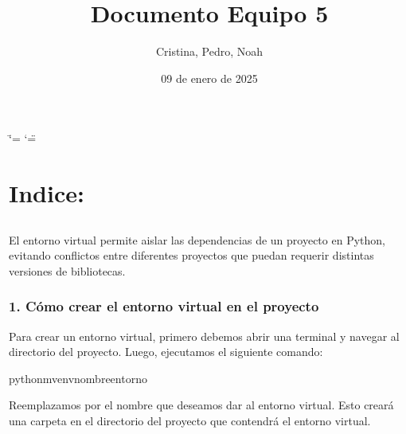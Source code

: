 \documentclass[a4paper,10pt,oneside,spanish,openany]{sphinxmanual}
\title{Documento Equipo 5 }
\date{09 de enero de 2025}
\author{Cristina, Pedro, Noah}
\begin{document}
\ifdefined\shorthandoff
  \ifnum\catcode`\=\string=\active\shorthandoff{=}\fi
  \ifnum\catcode`\"=\active{}\fi
\fi

\pagestyle{empty}
\sphinxmaketitle
\pagestyle{plain}

\pagestyle{normal}
\label{\detokenize{index::doc}}



\chapter{Indice:}
\label{\detokenize{index:indice}}
\sphinxstepscope


\section{}
\label{\detokenize{configuracion_inicial/001.env:entorno-virtual}}\label{\detokenize{configuracion_inicial/001.env::doc}}
\sphinxAtStartPar
El entorno virtual permite aislar las dependencias de un proyecto en Python, evitando conflictos entre diferentes proyectos que puedan requerir distintas versiones de bibliotecas.


\subsection{1. Cómo crear el entorno virtual en el proyecto}
\label{\detokenize{configuracion_inicial/001.env:como-crear-el-entorno-virtual-en-el-proyecto}}
\sphinxAtStartPar
Para crear un entorno virtual, primero debemos abrir una terminal y navegar al directorio del proyecto. Luego, ejecutamos el siguiente comando:

\begin{sphinxVerbatim}[commandchars=\\\{\}]
python\PYGZhy{}mvenvnombre\PYGZus{}entorno
\end{sphinxVerbatim}

\sphinxAtStartPar
Reemplazamos  por el nombre que deseamos dar al entorno virtual. Esto creará una carpeta en el directorio del proyecto que contendrá el entorno virtual.
\end{document}

